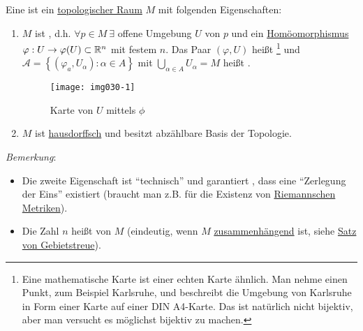 \begin{definition}
  \label{def:topologischeMannigfaltigkeit}
  Eine  ist ein \hyperref[def:topologie]{topologischer Raum} $ M $ mit folgenden Eigenschaften:
  \begin{enumerate}
    \item $ M $ ist \label{def:lokalEuklidisch}, d.h. $ \forall p \in M \ \exists $ offene Umgebung $ U $ von $ p $ und ein \hyperref[def:homoeomorphismus]{Homöomorphismus} $ \varphi: U \to \varphi(U) \subset \mathbb{R}^n $ mit festem $ n $. Das Paar $ (\varphi, U) $ heißt \label{def:karte}\footnote{Eine mathematische Karte ist einer echten Karte ähnlich. Man nehme einen Punkt, zum Beispiel Karlsruhe, und beschreibt die Umgebung von Karlsruhe in Form einer Karte auf einer DIN A4-Karte. Das ist natürlich nicht bijektiv, aber man versucht es möglichst bijektiv zu machen.} und $ \mathcal{A} = \left\{ (\varphi_a, U_\alpha) : \alpha \in A \right\} $ mit $ \bigcup_{\alpha \in A}U_\alpha = M $ heißt \label{def:atlas}.
    \begin{figure}[H]
      \label{img030-1}
      \texttt{[image: img030-1]}
      \caption{Karte von $ U $ mittels $ \phi $}
    \end{figure}
    \item $ M $ ist \hyperref[def:hausdorffsch]{hausdorffsch} und besitzt abzählbare Basis der Topologie.
  \end{enumerate}
  \emph{Bemerkung}:
  \begin{itemize}
    \item Die zweite Eigenschaft ist ``technisch'' und garantiert , dass eine ``Zerlegung der Eins'' existiert (braucht man z.B. für die Existenz von \hyperref[def:riemannscheMetrik]{Riemannschen Metriken}). 
    \item Die Zahl $ n $ heißt \label{def:dimension} von $ M $ (eindeutig, wenn $ M $ \hyperref[def:zusammenhaengend]{zusammenhängend} ist, siehe \hyperref[th:satzGebietstreue]{Satz von Gebietstreue}). 
  \end{itemize}
\end{definition}

